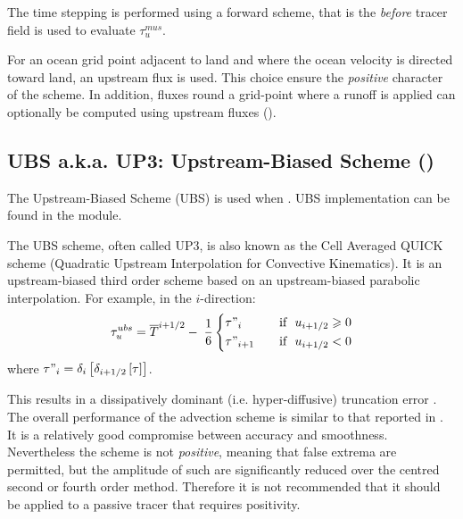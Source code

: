 \documentclass[../main/NEMO_manual]{subfiles}
\begin{document}
The time stepping is performed using a forward scheme,
that is the \textit{before} tracer field is used to evaluate $\tau_u^{mus}$.

For an ocean grid point adjacent to land and where the ocean velocity is directed toward land,
an upstream flux is used.
This choice ensure the \textit{positive} character of the scheme.
In addition, fluxes round a grid-point where a runoff is applied can optionally be computed using upstream fluxes
().

\subsection{UBS a.k.a. UP3: Upstream-Biased Scheme (\protect{})}
\label{subsec:TRA_adv_ubs}

The Upstream-Biased Scheme (UBS) is used when .
UBS implementation can be found in the  module.

The UBS scheme, often called UP3, is also known as the Cell Averaged QUICK scheme
(Quadratic Upstream Interpolation for Convective Kinematics).
It is an upstream-biased third order scheme based on an upstream-biased parabolic interpolation.
For example, in the $i$-direction:
\begin{equation}
  \label{eq:tra_adv_ubs}
  \tau_u^{ubs} =\overline T ^{i+1/2}-\;\frac{1}{6} \left\{
    \begin{aligned}
      &\tau"_i        	& \quad \text{if }\ u_{i+1/2} \geqslant 0      \\
      &\tau"_{i+1}	& \quad \text{if }\ u_{i+1/2}       <       0
    \end{aligned}
  \right.
\end{equation}
where $\tau "_i =\delta_i \left[ {\delta_{i+1/2} \left[ \tau \right]} \right]$.

This results in a dissipatively dominant (i.e. hyper-diffusive) truncation error
\citep{Shchepetkin_McWilliams_OM05}.
The overall performance of the advection scheme is similar to that reported in \cite{Farrow1995}.
It is a relatively good compromise between accuracy and smoothness.
Nevertheless the scheme is not \emph{positive}, meaning that false extrema are permitted,
but the amplitude of such are significantly reduced over the centred second or fourth order method.
Therefore it is not recommended that it should be applied to a passive tracer that requires positivity.
\end{document}
